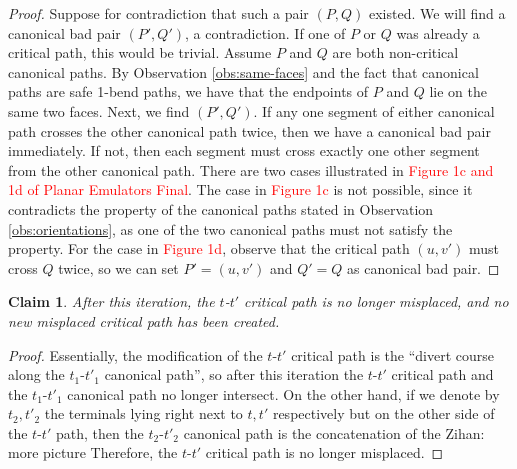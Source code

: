 \documentclass[11pt]{article}
\newcommand{\zihan}[1]{{\color{blue} Zihan: #1}}
\newtheorem{claim}[theorem]{Claim}
\begin{document}
\begin{proof}
    Suppose for contradiction that such a pair $(P,Q)$ existed. We will find a canonical bad pair $(P',Q')$, a contradiction. If one of $P$ or $Q$ was already a critical path, this would be trivial. Assume $P$ and $Q$ are both non-critical canonical paths. By Observation \ref{obs:same-faces} and the fact that canonical paths are safe 1-bend paths, we have that the endpoints of $P$ and $Q$ lie on the same two faces. Next, we find $(P',Q')$. If any one segment of either canonical path crosses the other canonical path twice, then we have a canonical bad pair immediately. If not, then each segment must cross exactly one other segment from the other canonical path. There are two cases illustrated in \textcolor{red}{Figure 1c and 1d of Planar Emulators Final}. The case in \textcolor{red}{Figure 1c} is not possible, since it contradicts the property of the canonical paths stated in Observation \ref{obs:orientations}, as one of the two canonical paths must not satisfy the property. For the case in \textcolor{red}{Figure 1d}, observe that the critical path $(u,v')$ must cross $Q$ twice, so we can set $P'=(u,v')$ and $Q'=Q$ as canonical bad pair.
\end{proof}




\iffalse
\begin{claim}
After this iteration, the $t$-$t'$ critical path is no longer misplaced, and no new misplaced critical path has been created.
\end{claim}
\begin{proof}
Essentially, the modification of the $t$-$t'$ critical path is the ``divert course along the $t_1$-$t'_1$ canonical path'', so after this iteration the $t$-$t'$ critical path and the $t_1$-$t'_1$ canonical path no longer intersect.
On the other hand, if we denote by $t_2,t'_2$ the terminals lying right next to $t,t'$ respectively but on the other side of the $t$-$t'$ path, then the $t_2$-$t'_2$ canonical path is the concatenation of the \zihan{more picture}
Therefore, the $t$-$t'$ critical path is no longer misplaced.
\end{proof}
\end{document}
